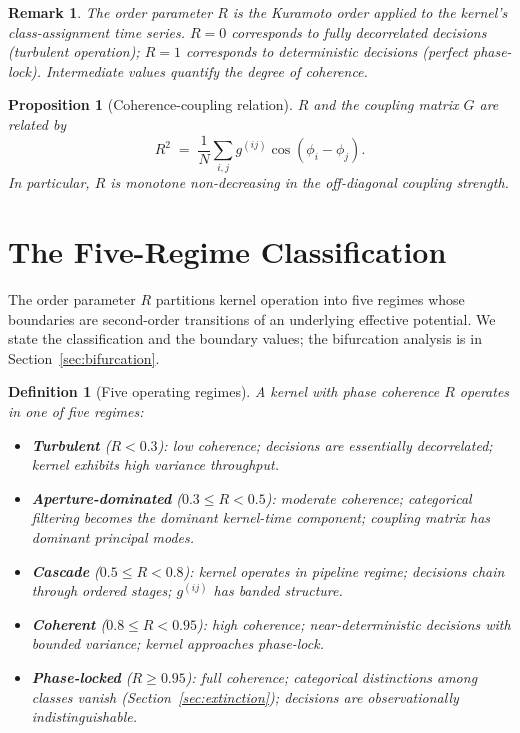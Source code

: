 \documentclass[twocolumn,11pt,a4paper]{article}
\newtheorem{proposition}[theorem]{Proposition}
\newtheorem{definition}[theorem]{Definition}
\newtheorem{remark}[theorem]{Remark}
\newcommand{\Rens}{R}
\begin{document}
\begin{remark}
The order parameter $\Rens$ is the Kuramoto order \citep{kuramoto1975} applied to the kernel's class-assignment time series. $\Rens = 0$ corresponds to fully decorrelated decisions (turbulent operation); $\Rens = 1$ corresponds to deterministic decisions (perfect phase-lock). Intermediate values quantify the degree of coherence.
\end{remark}

\begin{proposition}[Coherence-coupling relation]
\label{prop:coherence-coupling}
$\Rens$ and the coupling matrix $G$ are related by
\[
\Rens^2 \;=\; \frac{1}{N}\sum_{i,j} g^{(ij)} \cos(\phi_i - \phi_j).
\]
In particular, $\Rens$ is monotone non-decreasing in the off-diagonal coupling strength.
\end{proposition}

\section{The Five-Regime Classification}
\label{sec:regimes}

The order parameter $\Rens$ partitions kernel operation into five regimes whose boundaries are second-order transitions of an underlying effective potential. We state the classification and the boundary values; the bifurcation analysis is in Section~\ref{sec:bifurcation}.

\begin{definition}[Five operating regimes]
\label{def:regimes}
A kernel with phase coherence $\Rens$ operates in one of five regimes:
\begin{itemize}[nosep, leftmargin=*]
\item \textbf{Turbulent} ($\Rens < 0.3$): low coherence; decisions are essentially decorrelated; kernel exhibits high variance throughput.
\item \textbf{Aperture-dominated} ($0.3 \leq \Rens < 0.5$): moderate coherence; categorical filtering becomes the dominant kernel-time component; coupling matrix has dominant principal modes.
\item \textbf{Cascade} ($0.5 \leq \Rens < 0.8$): kernel operates in pipeline regime; decisions chain through ordered stages; $g^{(ij)}$ has banded structure.
\item \textbf{Coherent} ($0.8 \leq \Rens < 0.95$): high coherence; near-deterministic decisions with bounded variance; kernel approaches phase-lock.
\item \textbf{Phase-locked} ($\Rens \geq 0.95$): full coherence; categorical distinctions among classes vanish (Section~\ref{sec:extinction}); decisions are observationally indistinguishable.
\end{itemize}
\end{definition}
\end{document}
